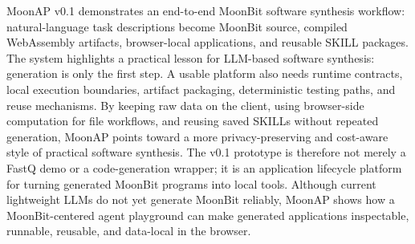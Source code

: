 \documentclass[11pt]{article}
\newcommand{\moonap}{MoonAP}
\newcommand{\skill}{SKILL}
\newcommand{\wasm}{WebAssembly}
\begin{document}
\moonap{} v0.1 demonstrates an end-to-end MoonBit software synthesis workflow: natural-language task descriptions become MoonBit source, compiled \wasm{} artifacts, browser-local applications, and reusable \skill{} packages. The system highlights a practical lesson for LLM-based software synthesis: generation is only the first step. A usable platform also needs runtime contracts, local execution boundaries, artifact packaging, deterministic testing paths, and reuse mechanisms. By keeping raw data on the client, using browser-side computation for file workflows, and reusing saved \skill{}s without repeated generation, \moonap{} points toward a more privacy-preserving and cost-aware style of practical software synthesis. The v0.1 prototype is therefore not merely a FastQ demo or a code-generation wrapper; it is an application lifecycle platform for turning generated MoonBit programs into local tools. Although current lightweight LLMs do not yet generate MoonBit reliably, \moonap{} shows how a MoonBit-centered agent playground can make generated applications inspectable, runnable, reusable, and data-local in the browser.



\end{document}
